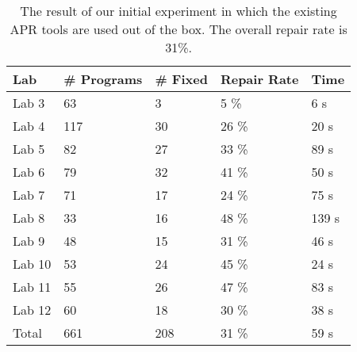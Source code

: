 \begin{table}[t!]
\centering
\caption{The result of our initial experiment in which the existing APR tools are used out of the box. The overall repair rate is 31\%.} 
\label{fig:base-result}
\begingroup\normalsize
\begin{tabular}{lllll}
  \toprule 
 Lab & \# Programs & \# Fixed & Repair Rate & Time \\
 \midrule 
 Lab 3 & 63 & 3 & 5 \% & 6 s \\ 
  Lab 4 & 117 & 30 & 26 \% & 20 s \\ 
  Lab 5 & 82 & 27 & 33 \% & 89 s \\ 
  Lab 6 & 79 & 32 & 41 \% & 50 s \\ 
  Lab 7 & 71 & 17 & 24 \% & 75 s \\ 
  Lab 8 & 33 & 16 & 48 \% & 139 s \\ 
  Lab 9 & 48 & 15 & 31 \% & 46 s \\ 
  Lab 10 & 53 & 24 & 45 \% & 24 s \\ 
  Lab 11 & 55 & 26 & 47 \% & 83 s \\ 
  Lab 12 & 60 & 18 & 30 \% & 38 s \\ 
   \bottomrule 
Total & 661 & 208 & 31 \% & 59 s \\ 
   \midrule 
\end{tabular}
\endgroup
\end{table}
